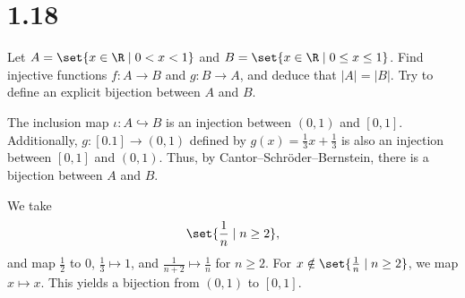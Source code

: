 \documentclass[12pt]{mypackage}
\begin{document}
\section{1.18}%
\begin{problem}
  Let $A = \set{x\in\R\mid 0 < x < 1}$ and $B = \set{x\in\R\mid 0\leq x \leq 1}$. Find injective functions $f: A\rightarrow B$ and $g: B\rightarrow A$, and deduce that $|A| = |B|$. Try to define an explicit bijection between $A$ and $B$.
\end{problem}
\begin{solution}
  The inclusion map $\iota: A\hookrightarrow B$ is an injection between $(0,1)$ and $[0,1]$. Additionally, $g: [0.1]\rightarrow (0,1)$ defined by $g(x) = \frac{1}{3}x + \frac{1}{3}$ is also an injection between $[0,1]$ and $(0,1)$. Thus, by Cantor--Schröder--Bernstein, there is a bijection between $A$ and $B$.\newline

 We take
 \begin{align*}
   \set{\frac{1}{n}\mid n\geq 2},
 \end{align*}
 and map $\frac{1}{2}$ to $0$, $\frac{1}{3}\mapsto 1$, and $\frac{1}{n+2} \mapsto \frac{1}{n}$ for $n\geq 2$. For $x\notin \set{\frac{1}{n}\mid n\geq 2}$, we map $x\mapsto x$. This yields a bijection from $\left(0,1\right)$ to $\left[0,1\right]$.
\end{solution}
%
\end{document}
